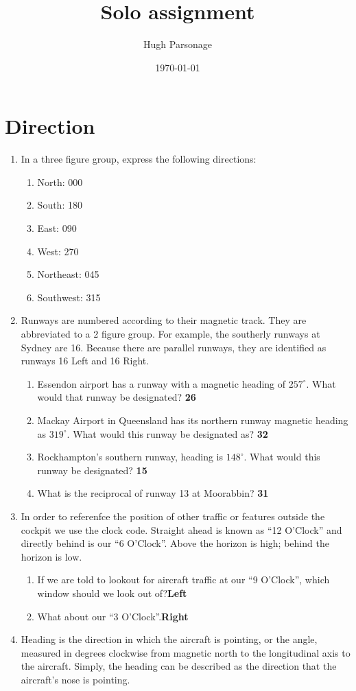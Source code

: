 \documentclass[11pt]{article}
\title{Solo assignment}
\author{Hugh Parsonage}
\date{\today}
\begin{document}
\section{Direction}

\begin{enumerate}
	\item In a three figure group, express the following directions:
	\begin{enumerate}
		\item North: 000
		\item South: 180
		\item East: 090
		\item West: 270
		\item Northeast: 045
		\item Southwest: 315
	\end{enumerate}
	\item Runways are numbered according to their magnetic track. They are abbreviated to a 2 figure group. For example, 
	the southerly runways at Sydney are 16. Because there are parallel runways, they are identified as runways 16 Left and 16 Right.
	\begin{enumerate}
		\item Essendon airport has a runway with a magnetic heading of \(257^\circ\). What would that runway be designated?
		\hfill
		\textbf{26}
		\item Mackay Airport in Queensland has its northern runway magnetic heading as \(319^\circ\). What would this runway be designated as?
		\hfill
		\textbf{32}
		\item Rockhampton's southern runway, heading is \(148^\circ\). What would this runway be designated?
		\hfill
		\textbf{15}
		\item What is the reciprocal of runway 13 at Moorabbin?
		\hfill
		\textbf{31}
	\end{enumerate}
	\item In order to referenfce the position of other traffic or features outside the cockpit we use the clock code. 
	Straight ahead is known as ``12 O'Clock'' and directly behind is our ``6 O'Clock''. Above the horizon is high; 
	behind the horizon is low.
	\begin{enumerate}
		\item If we are told to lookout for aircraft traffic at our ``9 O'Clock'', which window should we look out of?\hfill \textbf{Left}
		\item What about our ``3 O'Clock''.\hfill \textbf{Right}
	\end{enumerate}
	\item Heading is the direction in which the aircraft is pointing, or the angle, measured in degrees clockwise from magnetic north to the 
	longitudinal axis to the aircraft. Simply, the heading can be described as the direction that the aircraft's nose is pointing.


\end{enumerate}
\end{document}
